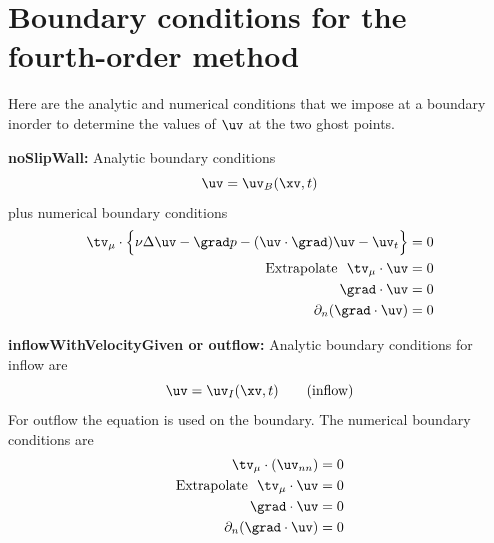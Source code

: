 \documentclass[10pt]{article}
\begin{document}
\clearpage



\clearpage


\clearpage





\clearpage

\newcommand{\nd}{n_d}
\newcommand{\PF}{\sum_{m=1}^{\nd} \grad_4 \ud_{m,i} \cdot D_{4 x_m} \uvd_i}
\newcommand{\Ds}{{\mathcal D}}
\newcommand{\Extrap}{D_{+m}^4}

\section{Boundary conditions for the fourth-order method}

Here are the analytic and numerical conditions that we impose at a boundary inorder
to determine the values of $\uv$ at the two ghost points.

{\bf noSlipWall:} 
Analytic boundary conditions
\[
  \uv = \uv_B(\xv,t)
\]
plus numerical boundary conditions
\begin{align*}
   \tv_\mu\cdot\Big\{ \nu\Delta\uv -\grad p - (\uv\cdot\grad)\uv -\uv_t \Big\} & = 0 \\
   \mbox{Extrapolate~~} \tv_\mu\cdot\uv &=0 \\
   \grad\cdot\uv &= 0 \\
   \partial_n(\grad\cdot\uv) &= 0 \\
\end{align*}


{\bf inflowWithVelocityGiven or outflow:}
Analytic boundary conditions for inflow are
\[
  \uv = \uv_I(\xv,t) \qquad\mbox{(inflow)}
\]
For outflow the equation is used on the boundary.
The numerical boundary conditions are
\begin{align*}
   \tv_\mu\cdot( \uv_{nn} ) &=0 \\
   \mbox{Extrapolate~~} \tv_\mu\cdot\uv &=0 \\
   \grad\cdot\uv &= 0 \\
   \partial_n(\grad\cdot\uv) &= 0 \\
\end{align*}
\end{document}

